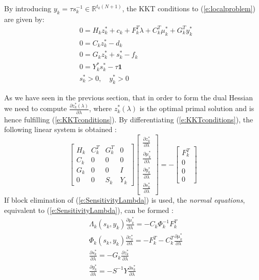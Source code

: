 By introducing $y_k = \tau s_k^{-1} \in \mathbb{R}^{t_k (N + 1)}$, the KKT conditions to (\ref{e:localproblem}) are given by:
\begin{subequations} \label{e:KKTconditions}
\begin{align}
& 0 = H_k z_k^* + c_k + F_k^T \lambda + C_k^T \mu_k^* + G_k^T y_k^* \\
& 0 = C_k z_k^* - d_k \\
& 0 = G_k z_k^* + s_k^* - f_k \\
& 0 = Y_k^* s_k^* - \tau \mathbf{1} \\
& s_k^* > 0, \quad y_k^* > 0
\end{align}
\end{subequations}

As we have seen in the previous section, that in order to form the dual Hessian we need to compute $\frac{\partial z_k^*(\lambda)}{\partial \lambda}$, where $z_k^*(\lambda)$ is the optimal primal solution and is hence fulfilling (\ref{e:KKTconditions}). By differentiating (\ref{e:KKTconditions}), the following linear system is obtained \cite{Klintberg2014}:
\begin{equation}
\label{e:SensitivityLambda}
\left[ \begin{array}{cccc}
H_k & C_k^T & G_k^T & 0 \\
C_k & 0 & 0 & 0 \\
G_k & 0 & 0 & I \\
0 & 0 & S_k & Y_k
\end{array} \right]
\left[ \begin{array}{c}
\frac{\partial z_k^*}{\partial \lambda} \\
\frac{\partial \mu_k^*}{\partial \lambda} \\
\frac{\partial y_k^*}{\partial \lambda} \\
\frac{\partial s_k^*}{\partial \lambda}
\end{array} \right] = -
\left[ \begin{array}{c}
F_k^T \\
0 \\
0 \\
0
\end{array} \right]
\end{equation}
If block elimination of (\ref{e:SensitivityLambda}) is used, the \emph{normal equations}, equivalent to (\ref{e:SensitivityLambda}), can be formed \cite{Wright1997}:
\begin{subequations}
\begin{align}
& \Lambda_k (s_k, y_k) \frac{\partial \mu_k^*}{\partial \lambda} = -C_k \Phi_k^{-1} F_k^T \label{e:firstNormalEquation} \\
& \Phi_k (s_k, y_k) \frac{\partial z_k^*}{\partial \lambda} = -F_k^T - C_k^T \frac{\partial \mu_k^*}{\partial \lambda} \label{e:secondNormalEquation} \\
& \frac{\partial s_k^*}{\partial \lambda} = -G_k \frac{\partial z_k^*}{\partial \lambda} \\
& \frac{\partial y_k^*}{\partial \lambda} = -S^{-1} Y \frac{\partial s_k^*}{\partial \lambda}
\end{align}
\end{subequations}
